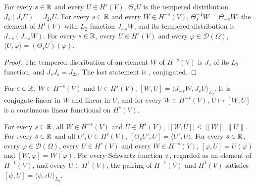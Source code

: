 \begin{lemma}[$\Theta_s$ is $J_{2s}$]
\label{lem:bessel-shift}
\leanok
{}
For every $s \in \mathbb{R}$ and every $U \in H^s(V)$, $\Theta_s U$ is the tempered distribution
$J_s(J_s U) = J_{2s} U$. For every $s \in \mathbb{R}$ and every $W \in H^{-s}(V)$,
$\Theta_s^{-1} W = \Theta_{-s} W$, the element of $H^s(V)$ with $L_2$ function $J_{-s} W$, and its
tempered distribution is $J_{-s}(J_{-s} W)$. For every $s \in \mathbb{R}$, every $U \in H^s(V)$ and every
$\varphi \in \mathcal D(\Omega)$, $\langle U, \varphi \rangle = \overline{(\Theta_s U)(\varphi)}$.
\end{lemma}

\begin{proof}
\leanok
The tempered distribution of an element $W$ of $H^{-s}(V)$ is $J_s$ of its $L_2$ function, and
$J_s J_s = J_{2s}$. The last statement is , conjugated.
\end{proof}

\begin{definition}
\label{def:sobolev-pairing}
\leanok
For $s \in \mathbb{R}$, $W \in H^{-s}(V)$ and $U \in H^s(V)$,
$[W, U] = \langle J_{-s} W, J_s U \rangle_{L_2}$. It is conjugate-linear in $W$ and linear in $U$,
and for every $W \in H^{-s}(V)$, $U \mapsto [W, U]$ is a continuous linear functional on
$H^s(V)$.
\end{definition}

\begin{proposition}
\label{prop:sobolev-pairing}
\leanok
{}
For every $s \in \mathbb{R}$, all $W \in H^{-s}(V)$ and $U \in H^s(V)$,
$|[W, U]| \leq \|W\| \, \|U\|$. For every $s \in \mathbb{R}$ and all $U', U \in H^s(V)$,
$[\Theta_s U', U] = \langle U', U \rangle$. For every $s \in \mathbb{R}$, every
$\varphi \in \mathcal D(\Omega)$, every $U \in H^s(V)$ and every $W \in H^{-s}(V)$,
$[\varphi, U] = U(\varphi)$ and $[W, \varphi] = \overline{W(\varphi)}$. For every Schwartz
function $\psi$, regarded as an element of $H^{-1}(V)$, and every $U \in H^1(V)$, the pairing of
$H^{-1}(V)$ and $H^1(V)$ satisfies $[\psi, U] = \langle \psi, \iota U \rangle_{L_2}$.
\end{proposition}


